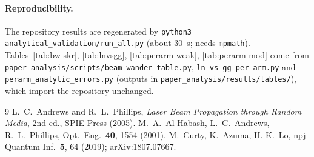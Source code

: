 \documentclass[11pt,a4paper]{article}
\theoremstyle{plain}
\theoremstyle{remark}
\begin{document}
\paragraph{Reproducibility.} The repository results are regenerated by \texttt{python3 analytical\_validation/run\_all.py} (about $30$~s; needs \texttt{mpmath}). Tables~\ref{tab:bw-skr}, \ref{tab:lnvsgg}, \ref{tab:perarm-weak}, \ref{tab:perarm-mod} come from \texttt{paper\_analysis/scripts/beam\_wander\_table.py}, \texttt{ln\_vs\_gg\_per\_arm.py} and \texttt{perarm\_analytic\_errors.py} (outputs in \texttt{paper\_analysis/results/tables/}), which import the repository unchanged.

\begin{thebibliography}{9}
 L.~C.~Andrews and R.~L.~Phillips, \emph{Laser Beam Propagation through Random Media}, 2nd ed., SPIE Press (2005).
 M.~A.~Al-Habash, L.~C.~Andrews, R.~L.~Phillips, Opt.\ Eng.\ \textbf{40}, 1554 (2001).
 M.~Curty, K.~Azuma, H.-K.~Lo, npj Quantum Inf.\ \textbf{5}, 64 (2019); arXiv:1807.07667.
\end{thebibliography}
\end{document}
